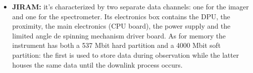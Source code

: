 \begin{itemize}
    \item \textbf{JIRAM:} it's characterized by two separate data channels: one for the imager and one for the spectrometer. Its electronics box contains the DPU, the proximity, the main electronics (CPU board), the power supply and the limited angle de spinning mechanism driver board. \cite{JIRAM_info} As for memory the instrument has both a 537 Mbit hard partition and a 4000 Mbit soft partition: the first is used to store data during observation while the latter houses the same data until the downlink process occurs. \cite{JIRAM_info_2}      
\end{itemize} 